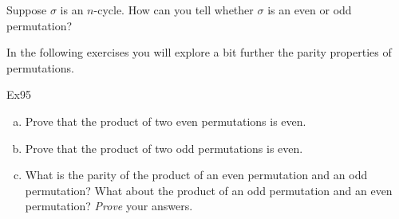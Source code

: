 \begin{exercise}{}
Suppose $\sigma$ is an $n$-cycle.  How can you tell  whether $\sigma$ is an even or odd permutation?
\end{exercise}


In the following exercises you will explore a bit further the parity properties of permutations. 

\begin{exercise}{Ex95}\label{ex:evenoddprod} %
\begin{enumerate}[(a)]
\item
Prove that the product of two even permutations is even.
\item
Prove that the product of two odd permutations is even.
\item
What is the parity of  the product of an even permutation and an odd permutation?  What about the product of an odd permutation and an even permutation? \emph{Prove} your answers.
\end{enumerate}
\end{exercise}
%
%
%
%
%

